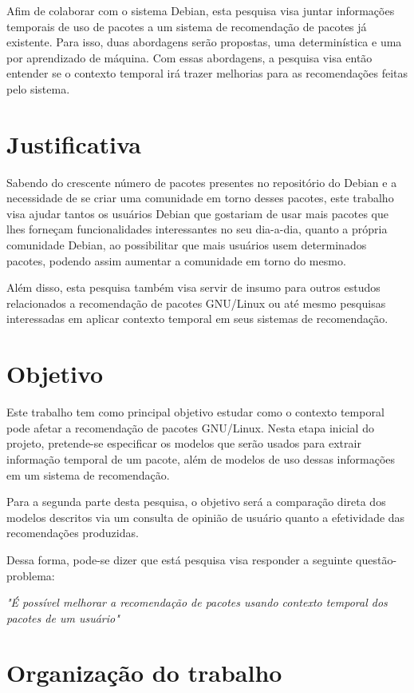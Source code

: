 Afim de colaborar com o sistema Debian, esta pesquisa visa juntar informações
temporais de uso de pacotes a um sistema de recomendação de pacotes já existente.
Para isso, duas abordagens serão propostas, uma determinística e uma por aprendizado
de máquina. Com essas abordagens, a pesquisa visa então entender se o contexto temporal
irá trazer melhorias para as recomendações feitas pelo sistema.

\section{Justificativa}

Sabendo do crescente número de pacotes presentes no repositório do Debian e a
necessidade de se criar uma comunidade em torno desses pacotes, este trabalho
visa ajudar tantos os usuários Debian que gostariam de usar mais pacotes que
lhes forneçam funcionalidades interessantes no seu dia-a-dia, quanto a própria
comunidade Debian, ao possibilitar que mais usuários usem determinados pacotes,
podendo assim aumentar a comunidade em torno do mesmo.

Além disso, esta pesquisa também visa servir de insumo para outros estudos
relacionados a recomendação de pacotes GNU/Linux ou até mesmo pesquisas
interessadas em aplicar contexto temporal em seus sistemas de recomendação.

\section{Objetivo}

Este trabalho tem como principal objetivo estudar como o contexto temporal pode
afetar a recomendação de pacotes GNU/Linux. Nesta etapa inicial do projeto,
pretende-se especificar os modelos que serão usados para extrair informação
temporal de um pacote, além de modelos de uso dessas informações em um sistema
de recomendação.

Para a segunda parte desta pesquisa, o objetivo será a comparação direta dos
modelos descritos via um consulta de opinião de usuário quanto a efetividade
das recomendações produzidas.

Dessa forma, pode-se dizer que está pesquisa visa responder a seguinte questão-problema:

\textit{"É possível melhorar a recomendação de pacotes usando contexto temporal
dos pacotes de um usuário"}

\section{Organização do trabalho}

